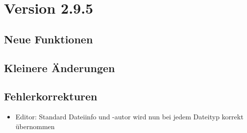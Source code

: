 \section{Version 2.9.5}
\subsection{Neue Funktionen}
\begin{itemize}
\end{itemize}


\subsection{Kleinere Änderungen}
\begin{itemize}
\end{itemize}


\subsection{Fehlerkorrekturen}
\begin{itemize}
\item Editor: Standard Dateiinfo und -autor wird nun bei jedem Dateityp korrekt übernommen
\end{itemize}
